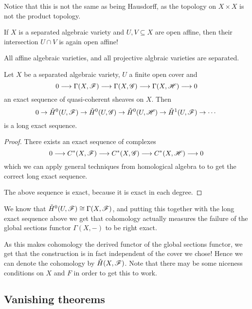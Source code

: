 Notice that this is not the same as being Hausdorff, as the topology on $X\times X$ is not the product topology. 

If $X$ is a separated algebraic variety and $U,V\subseteq X$ are open affine, then their intersection $U\cap V$ is again open affine!

\begin{example}
All affine algebraic varieties, and all projective algbraic varieties are separated. 
\end{example}

\begin{theorem}
Let $X$ be a separated algebraic variety, $U$ a finite open cover and 
\begin{equation*}
    0\longrightarrow \Gamma(X,\mathscr{F})\longrightarrow \Gamma(X,\mathscr{G})\longrightarrow \Gamma(X,\mathscr{H})\longrightarrow 0    
\end{equation*}
an exact sequence of quasi-coherent sheaves on $X$. Then 
\begin{equation*}
    0\to \check{H}^0(U,\mathscr{F})\to \check{H}^0(U,\mathscr{G}) \to \check{H}^0(U,\mathscr{H}) \to \check{H}^1(U,\mathscr{F}) \to \cdots
\end{equation*}
is a long exact sequence. 
\end{theorem}
\begin{proof}
There exists an exact sequence of complexes 
\begin{equation*}
    0\longrightarrow C^*(X,\mathscr{F})\longrightarrow C^*(X,\mathscr{G})\longrightarrow C^*(X,\mathscr{H})\longrightarrow 0
\end{equation*}
which we can apply general techniques from homological algebra to to get the correct long exact sequence. 

The above sequence is exact, because it is exact in each degree.
\end{proof}

We know that $\check{H}^0(U,\mathscr{F}) \cong \Gamma(X,\mathscr{F})$, and putting this together with the long exact sequence above we get that \Cech cohomology actually measures the failure of the global sections functor $\Gamma(X,-)$ to be right exact. 

As this makes \Cech cohomology the derived functor of the global sections functor, we get that the construction is in fact independent of the cover we chose! Hence we can denote the cohomology by $\check{H}(X,\mathscr{F})$. Note that there may be some niceness conditions on $X$ and $F$ in order to get this to work. 

\subsection{Vanishing theorems}

